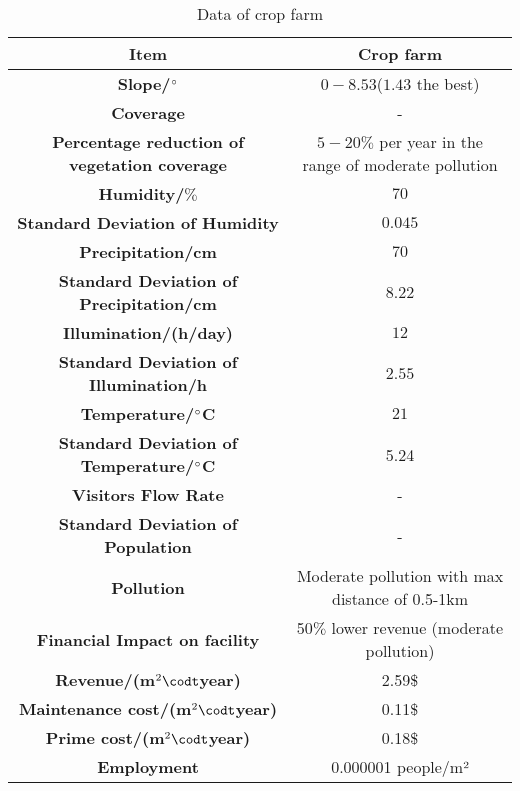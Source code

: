 \documentclass[./main.tex]{subfiles}
\begin{document}
    \begin{table}[H]
        \caption{Data of crop farm}
        \centering
        \begin{tabular}{c c}
        \toprule
        \textbf{Item} & \textbf{Crop farm} \\[0.25cm]
        \midrule
        \textbf{Slope/$\degree$} & $0-8.53$($1.43$ the best) \\[0.25cm]
        \textbf{Coverage} & - \\[0.25cm]
        \textbf{Percentage reduction of vegetation coverage} & $5-20\%$ per year in the range of moderate pollution \\[0.25cm]
        \textbf{Humidity/$\%$} & $70$ \\[0.25cm]
        \textbf{Standard Deviation of Humidity} & $0.045$ \\[0.25cm]
        \textbf{Precipitation/cm} & $70$ \\[0.25cm]
        \textbf{Standard Deviation of Precipitation/cm} & $8.22$ \\[0.25cm]
        \textbf{Illumination/(h/day)} & $12$ \\[0.25cm]
        \textbf{Standard Deviation of Illumination/h} & $2.55$ \\[0.25cm]
        \textbf{Temperature/$\degree$C} & $21$ \\[0.25cm]
        \textbf{Standard Deviation of Temperature/$\degree$C} & 5.24 \\[0.25cm]
        \textbf{Visitors Flow Rate} & - \\[0.25cm]
        \textbf{Standard Deviation of Population} & - \\[0.25cm]
        \textbf{Pollution} & Moderate pollution with max distance of 0.5-1km \\[0.25cm]
        \textbf{Financial Impact on facility} & 50$\%$ lower revenue (moderate pollution) \\[0.25cm]
        \textbf{Revenue/(m$^2 \codt$year)} & 2.59\$ \\[0.25cm]
        \textbf{Maintenance cost/(m$^2 \codt$year)} & 0.11\$ \\[0.25cm]
        \textbf{Prime cost/(m$^2 \codt$year)} & 0.18\$ \\[0.25cm]
        \textbf{Employment} & 0.000001 people/m² \\[0.25cm]
        \bottomrule
        \end{tabular}
    \end{table}
\end{document}
